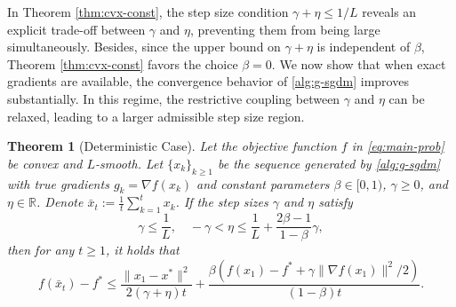 \documentclass[10pt]{article}
\numberwithin{equation}{section}
\newtheorem{theorem}{Theorem}
\theoremstyle{definition}
\newcommand{\rbb}{\mathbb{R}}  %
\begin{document}
In Theorem \ref{thm:cvx-const}, the step size condition $\gamma+\eta\leq 1/L$ reveals an explicit trade-off between $\gamma$ and $\eta$, preventing them from being large simultaneously. Besides, since the upper bound on $\gamma+\eta$ is independent of $\beta$, Theorem \ref{thm:cvx-const} favors the choice $\beta=0$. We now show that when exact gradients are available, the convergence behavior of \eqref{alg:g-sgdm} improves substantially. In this regime, the restrictive coupling between $\gamma$ and $\eta$ can be relaxed, leading to a larger admissible step size region.
%
\begin{theorem}[Deterministic Case]\label{thm:cvx-const-deter}
Let the objective function $f$ in \eqref{eq:main-prob} be convex and $L$-smooth. Let $\{x_k\}_{k\ge 1}$ be the sequence generated by \eqref{alg:g-sgdm} with true  gradients $g_k=\nabla f(x_k)$ and constant parameters $\beta\in [0,1)$, $\gamma\ge 0$, and $\eta\in \rbb$. Denote $\bar{x}_t:=\frac{1}{t}\sum_{k=1}^t x_k$. If the step sizes $\gamma$ and $\eta$ satisfy
\begin{equation}\label{eq:cvx-deter-lr}
    \gamma \leq \frac{1}{L},\quad -\gamma<\eta \leq \frac{1}{L}+\frac{2 \beta-1}{1-\beta} \gamma,
\end{equation}
then for any $t\ge 1$, it holds that
\[
f(\bar{x}_t)-f^* \leq \frac{\|x_1-x^*\|^2}{2(\gamma+\eta) t}+\frac{\beta (f(x_1)-f^*+\gamma\|\nabla f(x_1)\|^2/2)}{(1-\beta) t}.
\]
\end{theorem}
\end{document}
